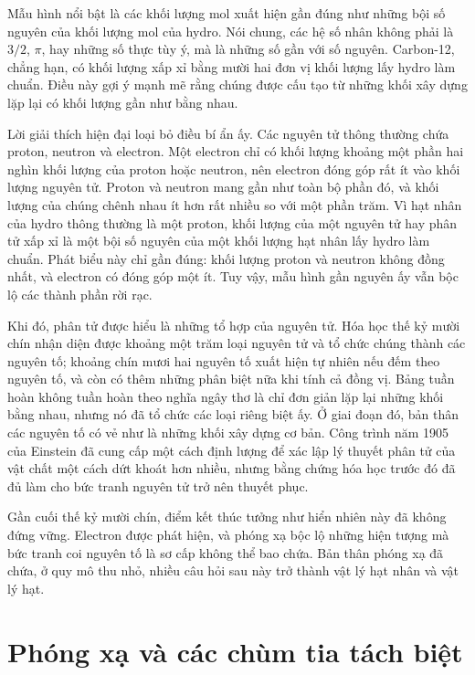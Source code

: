Mẫu hình nổi bật là các khối lượng mol xuất hiện gần đúng như những bội số nguyên của khối lượng mol của hydro. Nói chung, các hệ số nhân không phải là \(3/2\), \(\pi\), hay những số thực tùy ý, mà là những số gần với số nguyên. Carbon-12, chẳng hạn, có khối lượng xấp xỉ bằng mười hai đơn vị khối lượng lấy hydro làm chuẩn. Điều này gợi ý mạnh mẽ rằng chúng được cấu tạo từ những khối xây dựng lặp lại có khối lượng gần như bằng nhau.

Lời giải thích hiện đại loại bỏ điều bí ẩn ấy. Các nguyên tử thông thường chứa proton, neutron và electron. Một electron chỉ có khối lượng khoảng một phần hai nghìn khối lượng của proton hoặc neutron, nên electron đóng góp rất ít vào khối lượng nguyên tử. Proton và neutron mang gần như toàn bộ phần đó, và khối lượng của chúng chênh nhau ít hơn rất nhiều so với một phần trăm. Vì hạt nhân của hydro thông thường là một proton, khối lượng của một nguyên tử hay phân tử xấp xỉ là một bội số nguyên của một khối lượng hạt nhân lấy hydro làm chuẩn. Phát biểu này chỉ gần đúng: khối lượng proton và neutron không đồng nhất, và electron có đóng góp một ít. Tuy vậy, mẫu hình gần nguyên ấy vẫn bộc lộ các thành phần rời rạc.

Khi đó, phân tử được hiểu là những tổ hợp của nguyên tử. Hóa học thế kỷ mười chín nhận diện được khoảng một trăm loại nguyên tử và tổ chức chúng thành các nguyên tố; khoảng chín mươi hai nguyên tố xuất hiện tự nhiên nếu đếm theo nguyên tố, và còn có thêm những phân biệt nữa khi tính cả đồng vị. Bảng tuần hoàn không tuần hoàn theo nghĩa ngây thơ là chỉ đơn giản lặp lại những khối bằng nhau, nhưng nó đã tổ chức các loại riêng biệt ấy. Ở giai đoạn đó, bản thân các nguyên tố có vẻ như là những khối xây dựng cơ bản. Công trình năm 1905 của Einstein đã cung cấp một cách định lượng để xác lập lý thuyết phân tử của vật chất một cách dứt khoát hơn nhiều, nhưng bằng chứng hóa học trước đó đã đủ làm cho bức tranh nguyên tử trở nên thuyết phục.

Gần cuối thế kỷ mười chín, điểm kết thúc tưởng như hiển nhiên này đã không đứng vững. Electron được phát hiện, và phóng xạ bộc lộ những hiện tượng mà bức tranh coi nguyên tố là sơ cấp không thể bao chứa. Bản thân phóng xạ đã chứa, ở quy mô thu nhỏ, nhiều câu hỏi sau này trở thành vật lý hạt nhân và vật lý hạt.

\section{Phóng xạ và các chùm tia tách biệt}

